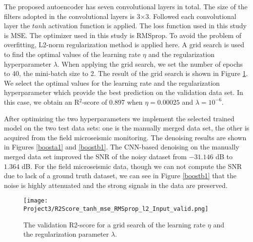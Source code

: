 \documentclass[a4paper]{article}
\begin{document}
The proposed autoencoder has seven convolutional layers in total. The size of the filters adopted in the convolutional layers is 3$\times$3. Followed each convolutional layer the $\textit{tanh}$ activation function is applied. The loss function used in this study is MSE. The optimizer used in this study is RMSprop. To avoid the problem of overfitting, L2-norm regularization method is applied here. A grid search is used to find the optimal values of the learning rate $\eta$ and the regularization hyperparameter $\lambda$. When applying the grid search, we set the number of epochs to 40, the mini-batch size to 2. The result of the grid search is shown in Figure \ref{R2Score}. We select the optimal values for the learning rate and the regularization hyperparameter which provide the best prediction on the validation data set. In this case, we obtain an R$^2$-score of 0.897 when $\eta = 0.00025$ and $\lambda = {10}^{-6}$.

After optimizing the two hyperparameters we implement the selected trained model on the two test data sets: one is the manually merged data set, the other is acquired from the field microseismic monitoring. The denoising results are shown in Figures \ref{boosta1} and \ref{boostb1}. The CNN-based denoising on the manually merged data set improved the SNR of the noisy dataset from $-31.146$ dB to $1.364$ dB. For the field microseismic data, though we can not compute the SNR due to lack of a ground truth dataset, we can see in Figure \ref{boostb1} that the noise is highly attenuated and the strong signals in the data are preserved.

\begin{figure}[H]
  \centering
  \texttt{[image: Project3/R2Score\_tanh\_mse\_RMSprop\_l2\_Input\_valid.png]}
  \caption{The validation R2-score for a grid search of the learning rate $\eta$ and the regularization parameter $\lambda$.}
    \label{R2Score}
\end{figure}

 
\end{document}
